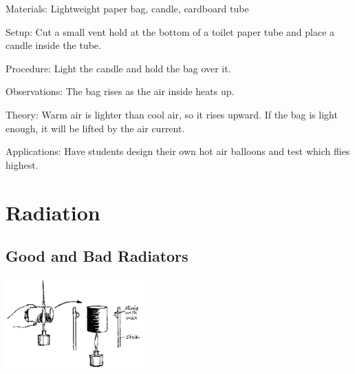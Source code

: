 \begin{multicols}{2}
\begin{description*}
\item[Materials:]{Lightweight paper bag, candle, cardboard tube}
\item[Setup:]{Cut a small vent hold at the bottom of a toilet paper tube and place a candle inside the tube.}
\item[Procedure:]{Light the candle and hold the bag over it.}
\item[Observations:]{The bag rises as the air inside heats up.}
\item[Theory:]{Warm air is lighter than cool air, so it rises upward. If the bag is light enough, it will be lifted by the air current.}
\item[Applications:]{Have students design their own hot air balloons and test which flies highest.}
\end{description*}


\section*{Radiation}


\subsection{Good and Bad Radiators}

\begin{center}
\includegraphics[width=0.4\textwidth]{./img/source/good-bad-radiators.png}
\end{center}


\end{multicols}
